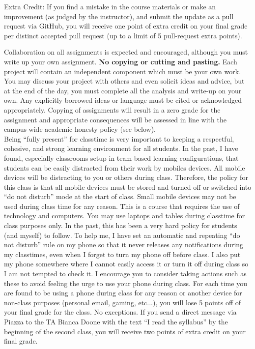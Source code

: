 \documentclass[10pt]{article}
\begin{document}
\noindent Extra Credit: If you find a mistake in the course materials or make an improvement (as judged by the instructor), and submit the update as a pull request via GitHub, you will receive one point of extra credit on your final grade per distinct accepted pull request (up to a limit of 5 pull-request extra points). 


\bigskip
{}

 Collaboration on all assignments is expected and encouraged, although you must write up your own assignment. {\bf No copying or cutting and pasting.} Each project will contain an independent component which must be your own work. You may discuss your project with others and even solicit ideas and advice, but at the end of the day, you must complete all the analysis and write-up on your own. Any explicitly borrowed ideas or language must be cited or acknowledged appropriately. Copying of assignments will result in a zero grade for the assignment and appropriate consequences will be assessed in line with the campus-wide academic honesty policy (see below). \\

  Being ``fully present'' for classtime is very important to keeping a respectful, cohesive, and strong learning environment for all students. In the past, I have found, especially classrooms setup in team-based learning configurations, that students can be easily distracted from their work by mobiles devices. All mobile devices will be distracting to you or others during class. Therefore, the policy for this class is that all mobile devices must be stored and turned off or switched into ``do not disturb'' mode at the start of class. Small mobile devices may not be used during class time for any reason. This is a course that requires the use of technology and computers. You may use laptops and tables during classtime for class purposes only. In the past, this has been a very hard policy for students (and myself) to follow. To help me, I have set an automatic and repeating ``do not disturb'' rule on my phone so that it never releases any notifications during my classtimes, even when I forget to turn my phone off before class. I also put my phone somewhere where I cannot easily access it or turn it off during class so I am not tempted to check it. I encourage you to consider taking actions such as these to avoid feeling the urge to use your phone during class. For each time you are found to be using a phone during class for any reason or another device for non-class purposes (personal email, gaming, etc...), you will lose 5 points off of your final grade for the class. No exceptions. If you send a direct message via Piazza to the TA Bianca Doone with the text ``I read the syllabus'' by the beginning of the second class, you will receive two points of extra credit on your final grade. \\
\end{document}
